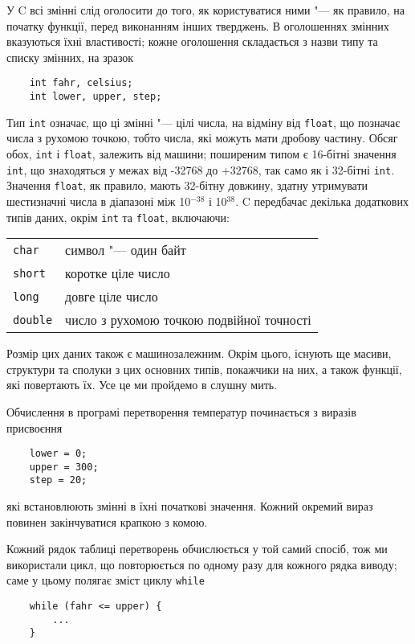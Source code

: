 \documentclass[a4paper,12pt]{book}
\begin{document}
  У C всі змінні слід оголосити до того, як користуватися ними "--- як правило, на початку
  функції, перед виконанням інших тверджень. В оголошеннях змінних вказуються їхні
  властивості; кожне оголошення складається з назви типу та списку змінних, на зразок
  \begin{verbatim}
    int fahr, celsius;
    int lower, upper, step;
  \end{verbatim}

  Тип \texttt{int} означає, що ці змінні "--- цілі числа, на відміну від
  \texttt{float}, що позначає числа з рухомою точкою, тобто числа, які можуть мати дробову
  частину. Обсяг обох, \texttt{int} і \texttt{float}, залежить від машини; поширеним типом
  є 16-бітні значення \texttt{int}, що знаходяться у межах від -32768 до +32768, так само
  як і 32-бітні \texttt{int}. Значення \texttt{float}, як правило, мають 32-бітну довжину,
  здатну утримувати шестизначні числа в діапазоні між 10\(^{-38}\) і 10\(^{38}\).
  C передбачає декілька додаткових типів даних, окрім \texttt{int} та \texttt{float},
  включаючи:

  \vspace{12pt}
  \begin{tabular}{@{}ll@{}}
  \texttt{char} & символ "--- один байт \\
  \texttt{short} & коротке ціле число \\
  \texttt{long} & довге ціле число \\
  \texttt{double} & число з рухомою точкою подвійної точності\\
  \end{tabular}
  \vspace{12pt}

  Розмір цих даних також є машинозалежним. Окрім цього, існують ще масиви, структури
  та сполуки з цих основних типів, покажчики на них, а також функції, які повертають їх.
  Усе це ми пройдемо в слушну мить.

  Обчислення в програмі перетворення температур починається з виразів присвоєння
  \begin{verbatim}
    lower = 0;
    upper = 300;
    step = 20;
  \end{verbatim}
  які встановлюють змінні в їхні початкові значення. Кожний окремий вираз повинен
  закінчуватися крапкою з комою.

  Кожний рядок таблиці перетворень обчислюється у той самий спосіб, тож ми використали
  цикл, що повторюється по одному разу для кожного рядка виводу; саме у цьому полягає
  зміст циклу \texttt{while}
  \begin{verbatim}
    while (fahr <= upper) {
        ...
    }
  \end{verbatim}
\end{document}

